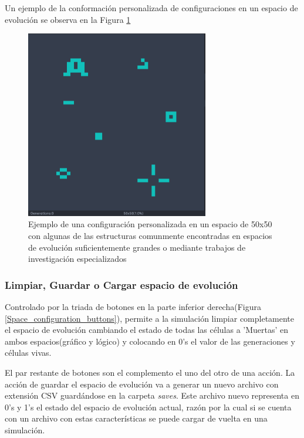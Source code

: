 \documentclass[]{article}
\begin{document}
			Un ejemplo de la conformación personalizada de configuraciones en un espacio de evolución se observa en la Figura \ref{Configuracion_personalizada}
			
			\begin{figure}[!h]
				\centering
				\includegraphics[width=8cm]{Imagenes/Configuracion_personalizada.png}
				\caption{Ejemplo de una configuración personalizada en un espacio de 50x50 con algunas de las estructuras comunmente encontradas en espacios de evolución suficientemente grandes o mediante trabajos de investigación especializados}
				\label{Configuracion_personalizada}
			\end{figure}
		
		\subsubsection{Limpiar, Guardar o Cargar espacio de evolución}
			Controlado por la triada de botones en la parte inferior derecha(Figura \ref{Space_configuration_buttons}), permite a la simulación limpiar completamente el espacio de evolución cambiando el estado de todas las células a 'Muertas' en ambos espacios(gráfico y lógico) y colocando en 0's el valor de las generaciones y células vivas.
			
			El par restante de botones son el complemento el uno del otro de una acción. La acción de guardar el espacio de evolución va a generar un nuevo archivo con extensión CSV guardándose en la carpeta \textit{saves}. Este archivo nuevo representa en 0's y 1's el estado del espacio de evolución actual, razón por la cual si se cuenta con un archivo con estas características se puede cargar de vuelta en una simulación.
			
			\hfill\break
			\hfill\break
			
\end{document}
